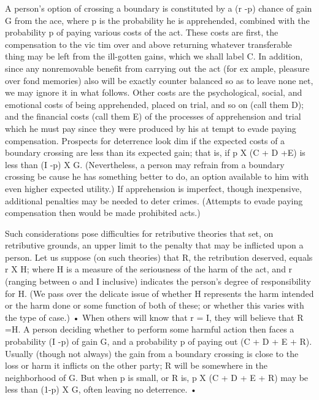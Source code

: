 \documentclass[11pt,openany]{book}
\begin{document}
A person's option of crossing a boundary is constituted by a (r -p) chance of gain G from the ace, where p is the probability he is apprehended, combined with the probability p of paying various costs of the act. These costs are first, the compensation to the vic tim over and above returning whatever transferable thing may be left from the ill-gotten gains, which we shall label C. In addition, since any nonremovable benefit from carrying out the act (for ex ample, pleasure over fond memories) also will be exactly counter balanced so as to leave none net, we may ignore it in what follows. Other costs are the psychological, social, and emotional costs of being apprehended, placed on trial, and so on (call them D); and the financial costs (call them E) of the processes of apprehension and trial which he must pay since they were produced by his at tempt to evade paying compensation. Prospects for deterrence look dim if the expected costs of a boundary crossing are less than its expected gain; that is, if p X (C + D +E) is less than (I -p) X G. (Nevertheless, a person may refrain from a boundary crossing be cause he has something better to do, an option available to him with even higher expected utility.) If apprehension is imperfect, though inexpensive, additional penalties may be needed to deter crimes. (Attempts to evade paying compensation then would be made prohibited acts.) 

Such considerations pose difficulties for retributive theories that set, on retributive grounds, an upper limit to the penalty that may be inflicted upon a person. Let us suppose (on such theories) that R, the retribution deserved, equals r X H; where H is a measure of the seriousness of the harm of the act, and r (ranging between o and I inclusive) indicates the person's degree of responsibility for H. (We pass over the delicate issue of whether H represents the harm intended or the harm done or some function of both of these; or whether this varies with the type of case.) • When others will know that r = I, they will believe that R =H. A person deciding whether to perform some harmful action then faces a probability (I -p) of gain G, and a probability p of paying out (C + D + E + R). Usually (though not always) the gain from a boundary crossing is close to the loss or harm it inflicts on the other party; R will be somewhere in the neighborhood of G. But when p is small, or R is, p X (C + D + E + R) may be less than (1-p) X G, often leaving no deterrence. • 
\end{document}
